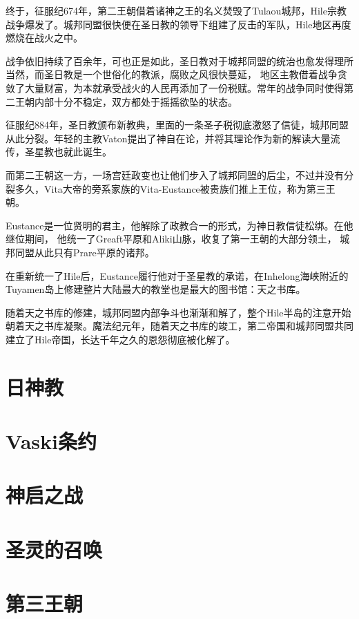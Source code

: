 \documentclass[UTF8,12pt]{ctexbook}
\begin{document}
        终于，征服纪674年，第二王朝借着诸神之王的名义焚毁了Tulaou城邦，Hile宗教战争爆发了。城邦同盟很快便在圣日教的领导下组建了反击的军队，Hile地区再度燃烧在战火之中。

        战争依旧持续了百余年，可也正是如此，圣日教对于城邦同盟的统治也愈发得理所当然，而圣日教是一个世俗化的教派，腐败之风很快蔓延，
        地区主教借着战争贪敛了大量财富，为本就承受战火的人民再添加了一份税赋。常年的战争同时使得第二王朝内部十分不稳定，双方都处于摇摇欲坠的状态。

        征服纪884年，圣日教颁布新教典，里面的一条圣子税彻底激怒了信徒，城邦同盟从此分裂。年轻的主教Vaton提出了神自在论，并将其理论作为新的解读大量流传，圣星教也就此诞生。

        而第二王朝这一方，一场宫廷政变也让他们步入了城邦同盟的后尘，不过并没有分裂多久，Vita大帝的旁系家族的Vita-Eustance被贵族们推上王位，称为第三王朝。

        Eustance是一位贤明的君主，他解除了政教合一的形式，为神日教信徒松绑。在他继位期间，
        他统一了Greaft平原和Aliki山脉，收复了第一王朝的大部分领土，
        城邦同盟从此只有Prare平原的诸邦。

        在重新统一了Hile后，Eustance履行他对于圣星教的承诺，在Inhelong海峡附近的Tuyamen岛上修建整片大陆最大的教堂也是最大的图书馆：天之书库。

        随着天之书库的修建，城邦同盟内部争斗也渐渐和解了，整个Hile半岛的注意开始朝着天之书库凝聚。魔法纪元年，随着天之书库的竣工，第二帝国和城邦同盟共同建立了Hile帝国，长达千年之久的恩怨彻底被化解了。


    \chapter{日神教}

    \chapter{Vaski条约}

    \chapter{神启之战}

    \chapter{圣灵的召唤}

    \chapter{第三王朝}
\end{document}
